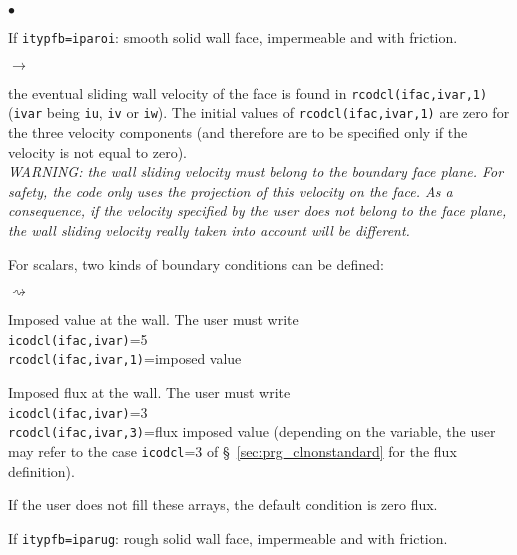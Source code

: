 {{{\begin{list}{$\bullet$}{}
\item If \texttt{itypfb=iparoi}: smooth solid wall face, impermeable and with friction.

\begin{list}{$\rightarrow$}{}
\item the eventual sliding wall velocity of the face is
      found in \texttt{rcodcl(ifac,ivar,1)} (\texttt{ivar} being
      \texttt{iu}, \texttt{iv} or \texttt{iw}). The initial
      values of \texttt{rcodcl(ifac,ivar,1)} are zero for
      the three velocity components (and therefore are to be specified
      only if the velocity is not equal to zero). \\
{\em WARNING: the wall sliding velocity must belong to the boundary face
      plane. For safety, the code only uses the projection of this
      velocity on the face. As a consequence, if the velocity specified
      by the user does not belong to the face plane, the wall sliding velocity really
      taken into account will be different.}

\item For scalars, two kinds of boundary conditions can be
      defined:
\begin{list}{$\rightsquigarrow$}{}
\item Imposed value at the wall. The user must write\\
\hspace*{1cm}\texttt{icodcl(ifac,ivar)}=5\\
\hspace*{1cm}\texttt{rcodcl(ifac,ivar,1)}=imposed value\\
\item Imposed flux at the wall. The user must write\\
\hspace*{1cm}\texttt{icodcl(ifac,ivar)}=3\\
\hspace*{1cm}\texttt{rcodcl(ifac,ivar,3)}=flux imposed value (depending on the variable, the user may refer to the case \texttt{icodcl}=3 of \S~\ref{sec:prg_clnonstandard} for the flux definition).
\item If the user does not fill these arrays, the default condition
      is zero flux.
\end{list}
\end{list}

\item If \texttt{itypfb=iparug}: rough solid wall face, impermeable and with friction.


\end{list}}}}
